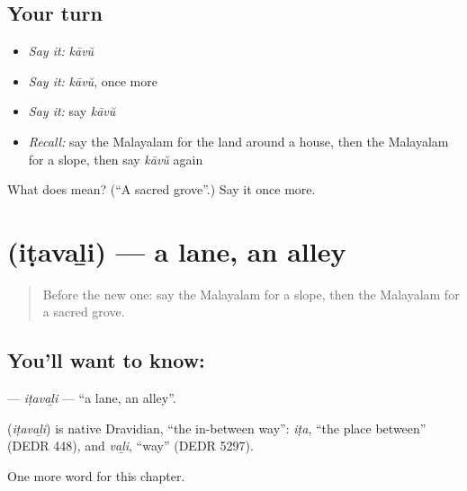 \subsection*{Your turn}
\begin{itemize}
\raggedright
  \item \emph{Say it:} \emph{kāvŭ}
  \item \emph{Say it:} \emph{kāvŭ}, once more
  \item \emph{Say it:} say \emph{kāvŭ}
  \item \emph{Recall:} say the Malayalam for the land around a house, then the Malayalam for a slope, then say \emph{kāvŭ} again
\end{itemize}

\begin{tcolorbox}[breakable,colback=teal!4,colframe=teal!35!black,title={Before you move on}]
What does  mean? (\textquotedblleft{}A sacred grove\textquotedblright{}.) Say it once more.
\end{tcolorbox}
\section[\texorpdfstring{\ml{ഇടവഴി} (iṭavaḻi)}{ഇടവഴി (iṭavaḻi)}]{ (iṭavaḻi) — a lane, an alley}

\label{lesson:ML-C280-itavali}



\begin{quote}
Before the new one: say the Malayalam for a slope, then the Malayalam for a sacred grove.
\end{quote}

\subsection*{You'll want to know: }
\textbf{} — \emph{iṭavaḻi} — \textquotedblleft{}a lane, an alley\textquotedblright{}.

\begin{cousinweb}
\textbf{} (\emph{iṭavaḻi}) is native Dravidian, \textquotedblleft{}the in-between way\textquotedblright{}: \emph{iṭa}, \textquotedblleft{}the place between\textquotedblright{} (DEDR 448), and \emph{vaḻi}, \textquotedblleft{}way\textquotedblright{} (DEDR 5297).
\end{cousinweb}

\begin{grammarlens}[title={What you've built}]
One more word for this chapter.
\end{grammarlens}

